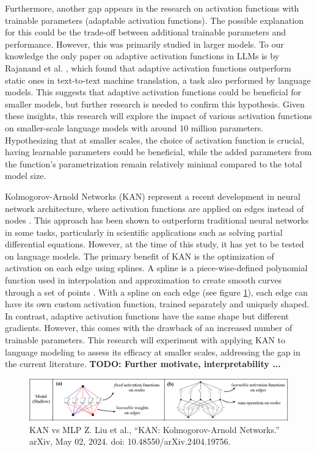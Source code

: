 Furthermore, another gap appears in the research on activation functions with trainable parameters (adaptable activation functions). The possible explanation for this could be the trade-off between additional trainable parameters and performance. However, this was primarily studied in larger models. To our knowledge the only paper on adaptive activation functions in LLMs is by Rajanand et al. \cite{Rajanand}, which found that adaptive activation functions outperform static ones in text-to-text machine translation, a task also performed by language models. This suggests that adaptive activation functions could be beneficial for smaller models, but further research is needed to confirm this hypothesis. Given these insights, this research will explore the impact of various activation functions on smaller-scale language models with around 10 million parameters. Hypothesizing that at smaller scales, the choice of activation function is crucial, having learnable parameters could be beneficial, while the added parameters from the function's parametrization remain relatively minimal compared to the total model size.

Kolmogorov-Arnold Networks (KAN) represent a recent development in neural network architecture, where activation functions are applied on edges instead of nodes \cite{Liu2024}. This approach has been shown to outperform traditional neural networks in some tasks, particularly in scientific applications such as solving partial differential equations. However, at the time of this study, it has yet to be tested on language models. The primary benefit of KAN is the optimization of activation on each edge using splines. A spline is a piece-wise-defined polynomial function used in interpolation and approximation to create smooth curves through a set of points \cite{chaudhuri_b-splines_2021}. With a spline on each edge (see figure \ref{fig:kan}), each edge can have its own custom activation function, trained separately and uniquely shaped. In contrast, adaptive activation functions have the same shape but different gradients. However, this comes with the drawback of an increased number of trainable parameters. This research will experiment with applying KAN to language modeling to assess its efficacy at smaller scales, addressing the gap in the current literature. \textbf{TODO: Further motivate, interpretability ...}

\begin{figure}[ht]
    \centering
    \includegraphics[width=\columnwidth * 2]{figures/kan-network.png}
    \caption{KAN vs MLP Z. Liu et al., “KAN: Kolmogorov-Arnold Networks.” arXiv, May 02, 2024. doi: 10.48550/arXiv.2404.19756.}
    \label{fig:kan}
\end{figure}